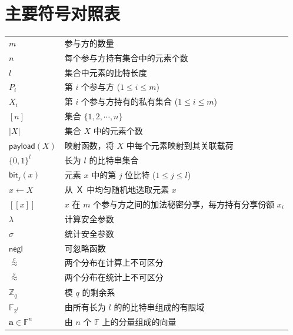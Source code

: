\documentclass{settings/sdu-thesis}
\newcommand{\bit}{\mathsf{bit}}
\newcommand{\F}[1]{\mathbb{F}_{2^{#1}}}
\begin{document}


\maketitlepagestatement



\content

\cleartochapter
{}
\chapter*{主要符号对照表}

\vspace{0.5cm} 
\noindent
\begin{longtable}{@{} >{\centering\arraybackslash}p{2.5cm} p{12cm} @{}}
        $m$ & 参与方的数量 \\
        $n$ & 每个参与方持有集合中的元素个数 \\
        $l$ & 集合中元素的比特长度 \\
        $P_i$ & 第 $i$ 个参与方 ($1 \le i \le m$) \\
        $X_i$ & 第 $i$ 个参与方持有的私有集合 ($1 \le i \le m$)\\
        $[n]$ & 集合 $\{1,2, \cdots, n\}$ \\
        $\lvert X \rvert$ & 集合 $X$ 中的元素个数 \\
        $\mathsf{payload}(X)$ & 映射函数，将 $X$ 中每个元素映射到其关联载荷 \\
        $\{0,1\}^l$ & 长为 $l$ 的比特串集合 \\
        $\bit_j(x)$ & 元素 $x$ 中的第 $j$ 位比特 ($1 \le j \le l$) \\
        $x \gets X$ & 从 $Ｘ$ 中均匀随机地选取元素 $x$ \\
        $[\! [ x ] \!]$ & $x$ 在 $m$ 个参与方之间的加法秘密分享，每方持有分享份额 $x_i$\\
        $\lambda$ & 计算安全参数 \\
        $\sigma$ & 统计安全参数 \\
        $\mathsf{negl}$ & 可忽略函数 \\
        $\overset{c}{\approx}$ & 两个分布在计算上不可区分 \\
        $\overset{s}{\approx}$ & 两个分布在统计上不可区分 \\
        $\mathbb{Z}_q$ & 模 $q$ 的剩余系 \\
        $\F{l}$ & 由所有长为 $l$ 的的比特串组成的有限域 \\
        $\textbf{a} \in \mathbb{F}^n$ & 由 $n$ 个 $\mathbb{F}$ 上的分量组成的向量 \\

\end{longtable}
\end{document}
